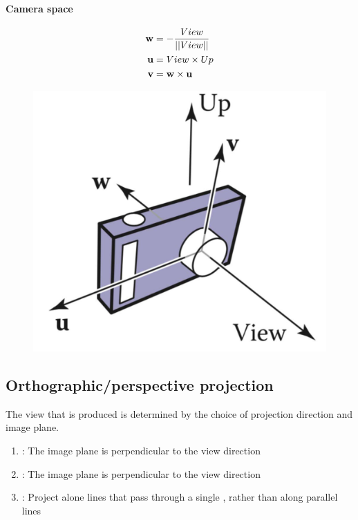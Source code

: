 \documentclass[11pt]{article}
\numberwithin{equation}{section}
\begin{document}
\paragraph{Camera space}
\begin{align}
	\textbf{w} &= -\frac{View}{||View||} \\
	\textbf{u} &= View \times Up \\
	\textbf{v} &= \textbf{w} \times \textbf{u}
\end{align}
	\begin{figure}[H]
	\centering
	\includegraphics[scale=0.4]{p26}
	\end{figure}

\subsection{Orthographic/perspective projection}
The view that is produced is determined by the choice of projection direction and image plane.
\begin{enumerate}
	\item {}: The image plane is perpendicular to the view direction
	\item {}: The image plane is  perpendicular to the view direction
	\item {}: Project alone lines that pass through a single , rather than along parallel lines
\end{enumerate}
\end{document}
